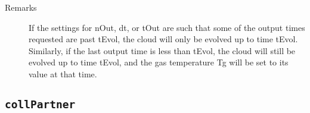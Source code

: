 \documentclass[letterpaper,10pt,english]{sphinxmanual}
\begin{document}
\begin{fulllineitems}
\begin{fulllineitems}
\begin{description}
\begin{description}
\end{description}

\item[{Remarks}] \leavevmode
If the settings for nOut, dt, or tOut are such that some of
the output times requested are past tEvol, the cloud will only
be evolved up to time tEvol. Similarly, if the last output
time is less than tEvol, the cloud will still be evolved up to
time tEvol, and the gas temperature Tg will be set to its
value at that time.

\end{description}

\end{fulllineitems}


\end{fulllineitems}



\subsection{\texttt{collPartner}}
\label{fulldoc:collpartner}
\end{document}
